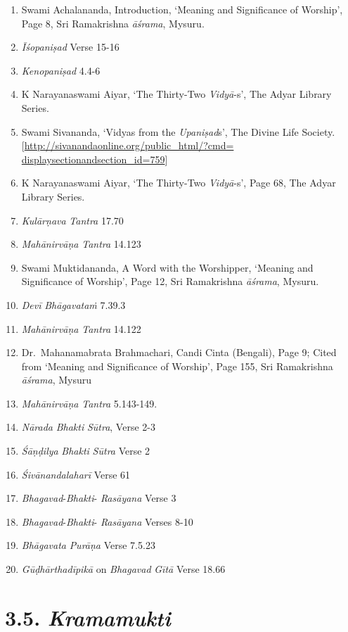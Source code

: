 \begin{enumerate}
\itemsep=0pt
\item
Swami Achalananda, Introduction, `Meaning and Significance of Worship', Page 8, Sri Ramakrishna \emph{āśrama}, Mysuru.
\item
\emph{Īśopaniṣad} Verse 15-16
\item
\emph{Kenopaniṣad} 4.4-6
\item
K Narayanaswami Aiyar, `The Thirty-Two \emph{Vidyā}-s', The Adyar Library Series.
\item
Swami Sivananda, `Vidyas from the \emph{Upaniṣad}s', The Divine Life Society. [\url{http://sivanandaonline.org/public_html/?cmd=}
\url{displaysectionandsection_id=759}]
\item
K Narayanaswami Aiyar, `The Thirty-Two \emph{Vidyā}-s', Page 68, The Adyar Library Series.
\item
\emph{Kulārṇava} \emph{Tantra} 17.70
\item
\emph{Mahānirvāṇa} \emph{Tantra} 14.123
\item
Swami Muktidananda, A Word with the Worshipper, `Meaning and Significance of Worship', Page 12, Sri Ramakrishna \emph{āśrama}, Mysuru.
\item
\emph{Devī} \emph{Bhāgavataṁ} 7.39.3
\item
\emph{Mahānirvāṇa} \emph{Tantra} 14.122
\item
Dr.\ Mahanamabrata Brahmachari, Candi Cinta (Bengali), Page 9; Cited from `Meaning and Significance of Worship', Page 155, Sri Ramakrishna \emph{āśrama}, Mysuru
\item
\emph{Mahānirvāṇa} \emph{Tantra} 5.143-149.
\item
\emph{Nārada} \emph{Bhakti} \emph{Sūtra}, Verse 2-3
\item
\emph{Śāṇḍilya} \emph{Bhakti} \emph{Sūtra} Verse 2
\item
\emph{Śivānandalaharī} Verse 61
\item
\emph{Bhagavad}-\emph{Bhakti}- \emph{Rasāyana} Verse 3
\item
\emph{Bhagavad}-\emph{Bhakti}- \emph{Rasāyana} Verses 8-10
\item
\emph{Bhāgavata} \emph{Purāṇa} Verse 7.5.23
\item
\emph{Gūḍhārthadīpikā} on \emph{Bhagavad} \emph{Gītā} Verse 18.66
\end{enumerate}
\newpage

\section*{3.5. \emph{Kramamukti}}


